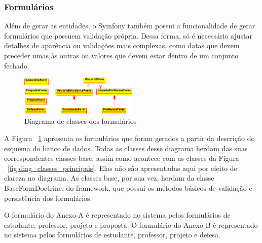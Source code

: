 \subsubsection{Formulários}
Além de gerar as entidades, o Symfony também possui a funcionalidade de gerar formulários que
possuem validação própria. Dessa forma, só é necessário ajustar detalhes de aparência ou
validações mais complexas, como datas que devem preceder umas às outras ou valores que devem 
estar dentro de um conjunto fechado.

\begin{figure}[htbp]
\centering
\includegraphics[width=0.5\textwidth]{fig/uml_forms.png}
\caption{Diagrama de classes dos formulários}
\label{fig:diag_forms}
\end{figure}

A Figura ~\ref{fig:diag_forms} apresenta os formulários que foram gerados a partir da descrição 
do esquema do banco de dados. Todas as classes desse diagrama herdam das suas correspondentes 
classes base, assim como acontece com as classes da Figura ~\ref{fig:diag_classes_principais}.
Elas não são apresentadas aqui por efeito de clareza no diagrama. As classes base, por sua vez,
herdam da classe BaseFormDoctrine, do framework, que possui os métodos básicos de validação e 
persistência dos formulários. 

O formulário do Anexo A é representado no sistema pelos formulários de estudante, 
professor, projeto e proposta. O formulário do Anexo B é representado no sistema 
pelos formulários de estudante, professor, projeto e defesa. 

